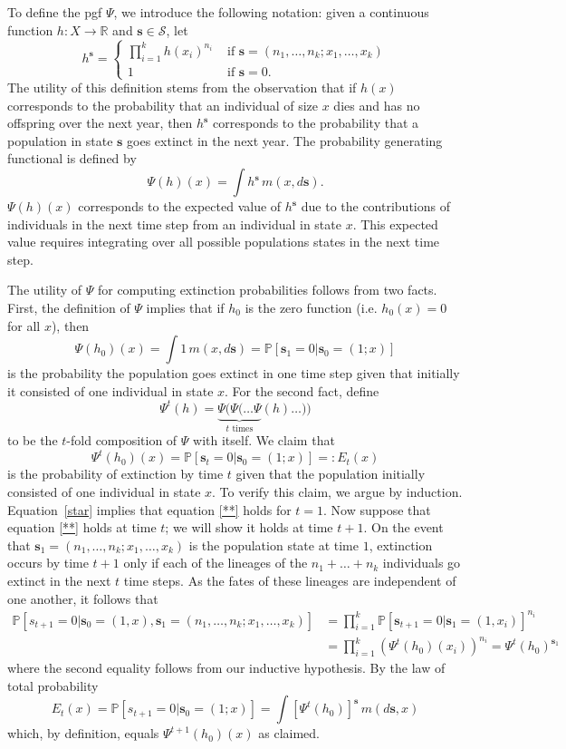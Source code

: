\documentclass[12pt]{amsart}\usepackage[]{graphicx}\usepackage[]{color}
\def\R{\mathbb R}
\def\P{\mathbb P}
\def\S{\mathcal S}
\def\s{\mathbf s}
\begin{document}
To define the pgf $\Psi$, we introduce the following notation: given a continuous function $h:X\to\R$ and $\s\in \S$, let
\[
h^\s=
\left\{
\begin{array}{cc}
\prod_{i=1}^k h(x_i)^{n_i}&\mbox{ if }\s=(n_1,\dots,n_k;x_1,\dots,x_k)\\
1 &\mbox{ if }\s=0.
\end{array}
\right.
\]
The utility of this definition stems from the observation that if $h(x)$ corresponds to the probability that an individual of size $x$ dies and has no offspring over the next year, then $h^\s$ corresponds to the probability that a population in state $\s$ goes extinct in the next year. The probability generating functional is defined by
\begin{equation}\label{*}
\Psi(h)(x)=\int h^\s \,m(x,d\s).
\end{equation}
$\Psi(h)(x)$ corresponds to the expected value of $h^\s$ due to the contributions of individuals in the next time step from an individual in state $x$. This expected value requires integrating over all possible populations states in the next time step.

The utility of $\Psi$ for computing extinction probabilities follows from two facts. First, the definition of $\Psi$ implies that if $h_0$ is the zero function (i.e. $h_0(x)=0$ for all $x$), then
\begin{equation}\label{star}
\Psi(h_0)(x)=\int 1 \,m(x,d\s)= \P[\s_1=0|\s_0=(1;x)]
\end{equation}
is the probability the population goes extinct in one time step given that initially it consisted of one individual in state $x$. For the second fact, define
\[
\Psi^t(h)=\underbrace{\Psi(\Psi(\dots \Psi}_{\mbox{$t$ times}}(h)\dots))
\]
to be the $t$-fold composition of $\Psi$ with itself. We claim that
\begin{equation}\label{**}
\Psi^t(h_0)(x)=\P[\s_t=0|\s_0=(1;x)]=:E_t(x)
\end{equation}
is the probability of extinction by time $t$ given that the population initially consisted of one individual in state $x$. To verify this claim, we argue by induction. Equation~\ref{star} implies that equation \eqref{**} holds for $t=1$. Now suppose that equation \eqref{**} holds at time $t$; we will show it holds at time $t+1$.  On the event that $\s_1=(n_1,\dots,n_k;x_1,\dots,x_k)$ is the population state at time $1$, extinction occurs by time $t+1$ only if each of the lineages of the $n_1+\dots +n_k$ individuals go extinct in the next $t$ time steps. As the fates of these lineages are independent of one another, it follows that
\[
\begin{aligned}
\P[s_{t+1}=0|\s_0=(1,x),\s_1=(n_1,\dots,n_k;x_1,\dots,x_k)]&= \prod_{i=1}^k \P[\s_{t+1}=0|\s_1=(1,x_i)]^{n_i}\\
&=\prod_{i=1}^k\left(\Psi^t(h_0)(x_i)\right)^{n_i}=\Psi^t(h_0)^{\s_1}
\end{aligned}
\]
where the second equality follows from our inductive hypothesis. By the law of total probability
\[
E_t(x)=\P[s_{t+1}=0|\s_0=(1;x)]=\int [\Psi^t(h_0)]^\s \,m(d\s,x)
\]
which, by definition, equals $\Psi^{t+1}(h_0)(x)$ as claimed.
\end{document}

